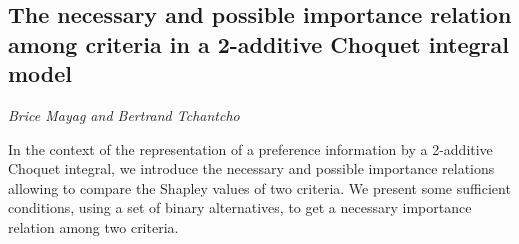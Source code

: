 \documentclass[../booklet.tex]{subfiles}
\begin{document}
\subsection[The necessary and possible importance relation among criteria in a 2-additive Choquet integral model. {\it Brice Mayag and Bertrand Tchantcho}]{The necessary and possible importance relation among criteria in a 2-additive Choquet integral model}
 

\begin{center}
  {\it Brice Mayag and Bertrand Tchantcho}
\end{center}

\vskip 0.8cm


In the context of the representation of a preference information by a 2-additive Choquet integral, we introduce  the necessary and possible importance relations allowing to compare the Shapley values of two criteria. We present some sufficient conditions, using a set of binary alternatives, to get a necessary importance relation among two criteria. 

\end{document}
